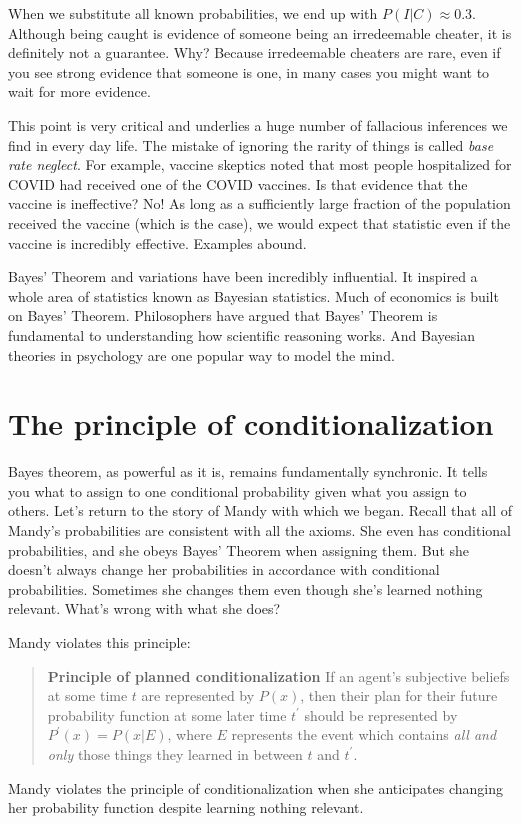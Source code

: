 When we substitute all known probabilities, we end up with $P(I|C) \approx 0.3$.  Although being caught is evidence of someone being an irredeemable cheater, it is definitely not a guarantee.  Why?  Because irredeemable cheaters are rare, even if you see strong evidence that someone is one, in many cases you might want to wait for more evidence.


This point is very critical and underlies a huge number of fallacious inferences we find in every day life.  The mistake of ignoring the rarity of things is called {\it base rate neglect}. For example, vaccine skeptics noted that most people hospitalized for COVID had received one of the COVID vaccines. Is that evidence that the vaccine is ineffective? No! As long as a sufficiently large fraction of the population received the vaccine (which is the case), we would expect that statistic even if the vaccine is incredibly effective.  Examples abound.

Bayes' Theorem and variations have been incredibly influential.  It inspired a whole area of statistics known as Bayesian statistics. Much of economics is built on Bayes' Theorem. Philosophers have argued that Bayes' Theorem is fundamental to understanding how scientific reasoning works. And Bayesian theories in psychology are one popular way to model the mind.

\section{The principle of conditionalization}

Bayes theorem, as powerful as it is, remains fundamentally synchronic. It tells you what to assign to one conditional probability given what you assign to others.  Let's return to the story of Mandy with which we began.  Recall that all of Mandy's probabilities are consistent with all the axioms.  She even has conditional probabilities, and she obeys Bayes' Theorem when assigning them. But she doesn't always change her probabilities in accordance with conditional probabilities.  Sometimes she changes them even though she's learned nothing relevant.  What's wrong with what she does?

Mandy violates this principle:
\begin{quote}
{\bf Principle of planned conditionalization} If an agent's subjective beliefs at some time $t$ are represented by $P(x)$, then their plan for their future probability function at some later time $t^\prime$ should be represented by $P^\prime(x) = P(x|E)$, where $E$ represents the event which contains {\it all and only} those things they learned in between $t$ and $t^\prime$.  
\end{quote}
Mandy violates the principle of conditionalization when she anticipates changing her probability function despite learning nothing relevant.

